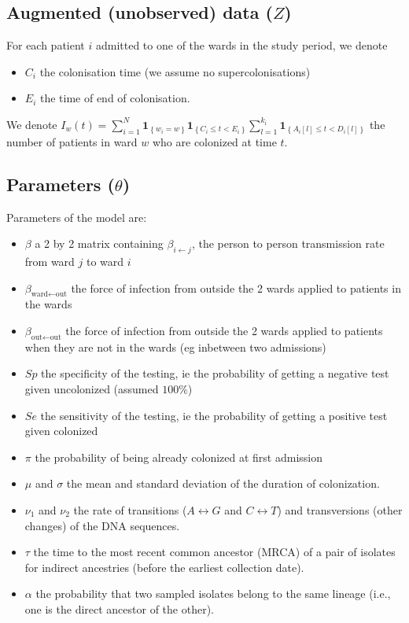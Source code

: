 \documentclass[10pt]{article}
\begin{document}
\subsection*{Augmented (unobserved) data ($Z$)}

For each patient $i$ admitted to one of the wards in the study period, we denote 
\begin{itemize}
	\item $C_i$ the colonisation time (we assume no supercolonisations)
	\item $E_i$ the time of end of colonisation.
\end{itemize}

\noindent We denote $I_w\left(t\right)=\sum_{i=1}^{N} \mathbf{1}_{\left\lbrace w_i=w \right\rbrace} \mathbf{1}_{\left\lbrace C_i \leq t < E_i \right\rbrace} \sum_{l=1}^{k_i} \mathbf{1}_{\left\lbrace A_i[l] \leq t < D_i[l] \right\rbrace} $  the number of patients in ward $w$ who are colonized at time $t$.

\subsection*{Parameters ($\theta$)}

Parameters of the model are: 
\begin{itemize}
	\item $\beta$ a 2 by 2 matrix containing $\beta_{i \leftarrow j}$, the person to person transmission rate from ward $j$ to ward $i$
	\item $\beta_{\text{ward} \leftarrow \text{out}}$ the force of infection from outside the 2 wards applied to patients in the wards
	\item $\beta_{\text{out} \leftarrow \text{out}}$ the force of infection from outside the 2 wards applied to patients when they are not in the wards (eg inbetween two admissions)
	\item $Sp$ the specificity of the testing, ie the probability of getting a negative test given uncolonized (assumed $100\%$)
	\item $Se$ the sensitivity of the testing, ie the probability of getting a positive test given colonized
	\item $\pi$ the probability of being already colonized at first admission
	\item $\mu$ and $\sigma$ the mean and standard deviation of the duration of colonization.
	\item $\nu_1$ and $\nu_2$ the rate of transitions ($A \leftrightarrow G$ and $C \leftrightarrow T$) and transversions (other changes) of the DNA sequences.
	\item $\tau$ the time to the most recent common ancestor (MRCA) of a pair of isolates for indirect ancestries (before the earliest collection date).
	\item $\alpha$ the probability that two sampled isolates belong to the same lineage (i.e., one is the direct ancestor of the other).
\end{itemize}
\end{document}
